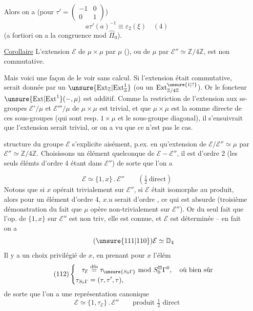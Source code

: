 
Alors on a (pour $\tau'=\begin{pmatrix}-1&0\\0&1\end{pmatrix}$)
\[
a\tau'(a)^{-1}\equiv\varepsilon_2(\xi)\quad(4)
\]
(a fortiori on a la congruence mod $\widehat{\Pi}_0$).

\uline{Corollaire} L'extension $\mathcal E$ de $\mu\times\mu$ par $\mu$
(), ou de $\mu$ par $\mathcal E''\simeq\mathbb Z/4\mathbb Z$, est non
commutative.
\margin{$\big|$}

Mais voici une façon de le voir sans calcul. Si l'extension était commutative,
  serait donnée par un
$\unsure{\mathrm{Ext}_{\mathbb Z}|\mathrm{Ext}^1_{\mathbb Z}}$
(ou un $\mathrm{Ext}^{\unsure{1|?}}_{\mathbb Z/4\mathbb Z}$).
Or le foncteur $\unsure{\mathrm{Ext}|\mathrm{Ext}^1}(-,\mu)$ est additif. Comme la restriction de
l'extension aux ss-groupes $\mathcal E'/\mu$ et $\mathcal E'''/\mu$ de
$\mu\times\mu$ est trivial, et que $\mu\times\mu$ est
la somme directe de ces sous-groupes (qui sont resp. $1\times\mu$ et le
sous-groupe diagonal), il s'ensuivrait que l'extension serait
trivial, or on a vu que ce n'est pas le cas.

  structure du groupe $\mathcal E$
s'explicite aisément, p.ex. en  qu'extension de
$\mathcal E/\mathcal E''\simeq\mu$ par
$\mathcal E''\simeq\mathbb Z/4\mathbb Z$. 
Choisissons un élément quelconque de $\mathcal E-\mathcal E''$, il est
d'ordre 2 (les seuls élémts d'ordre 4 étant dans $\mathcal E''$) de sorte
que l'on a


\[
\tag{110}
\mathcal E\simeq\{1,x\}\mathbin{.}\mathcal E''
\qquad\left(\tfrac12\ \text{direct}\right)
\]
Notons que si $x$ opérait trivialement sur $\mathcal E''$,
 si $\mathcal E$ était isomorphe au produit, alors pour un
élément  d'ordre 4,
$x.u$ serait d'ordre , ce qui est absurde (troisième démonstration du fait
que  $\mu$ opère non-trivialement
sur $\mathcal E''$). Or du seul fait que l'op. de $\{1,x\}$ sur
$\mathcal E''$ est non triv, elle est connue, et
 $\mathcal E$ est déterminée -- en fait on a
\[
\tag{\unsure{111|110}}
\mathcal E\simeq\mathbb D_4
\]
Il y a un choix privilégié de $x$, en prenant pour $x$ l'élém
\[
\tag{112}
\left\{\begin{aligned}
\tau_{\mathcal E}&\overset{\mathrm{dfn}}{=}
\tau_{\unsure{S_0\Gamma}}\ \mathrm{mod}\ S_0^{\Pi}\Gamma^0,
\quad\text{où bien sûr}\\
\tau_{S_0\Gamma}&=(\tau,\tau',\tau),
\end{aligned}\right.
\]
de sorte que l'on a une représentation canonique
\[
\tag{113}
\mathcal E\simeq\{1,\tau_{\mathcal E}\}\mathbin{.}
\mathcal E''
\qquad\text{produit }\tfrac12\text{ direct}
\]

